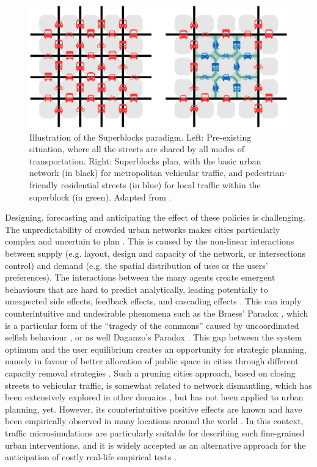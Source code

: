 \begin{figure}[htbp!]
    \centering
    \includegraphics[width=1\textwidth]{LCBM_fig01.jpg}
    \caption{Illustration of the Superblocks paradigm. Left: Pre-existing situation, where all the streets are shared by all modes of transportation. Right: Superblocks plan, with the basic urban network (in black) for metropolitan vehicular traffic, and pedestrian-friendly residential streets (in blue) for local traffic within the superblock (in green). Adapted from \citep{Rueda2018}.}
   \label{fig:LCBM_fig01}
\end{figure}

Designing, forecasting and anticipating the effect of these policies is challenging. The unpredictability of crowded urban networks makes cities particularly complex and uncertain to plan \citep{Port00,Bettencourt2014}. This is caused by the non-linear interactions between supply (e.g. layout, design and capacity of the network, or intersections control) and demand (e.g. the spatial distribution of uses or the users’ preferences). The interactions between the many agents create emergent behaviours that are hard to predict analytically, leading potentially to unexpected side effects, feedback effects, and cascading effects \citep{Helbing2013}. This can imply counterintuitive and undesirable phenomena such as the Braess’ Paradox \citep{Braess1969}, which is a particular form of the “tragedy of the commons” \citep{Hardin1968} caused by uncoordinated selfish behaviour \citep{Roughgarden2005}, or as well Daganzo’s Paradox \citep{Sheffi1978}. This gap between the system optimum and the user equilibrium creates an opportunity for strategic planning, namely in favour of better allocation of public space in cities through different capacity removal strategies \citep{Bagloee2019,Zhang2020}. Such a pruning cities approach, based on closing streets to vehicular traffic, is somewhat related to network dismantling, which has been extensively explored in other domains \citep{Ren2019}, but has not been applied to urban planning, yet. However, its counterintuitive positive effects are known and have been empirically observed in many locations around the world \citep{Baker2009,Chung2012,Knodel1969,Kolata1990,Youn.etal.2008,Cairns.etal1998,Cairns2002}. In this context, traffic microsimulations are particularly suitable for describing such fine-grained urban interventions, and it is widely accepted as an alternative approach for the anticipation of costly real-life empirical tests \citep{Vinitsky2018}.

